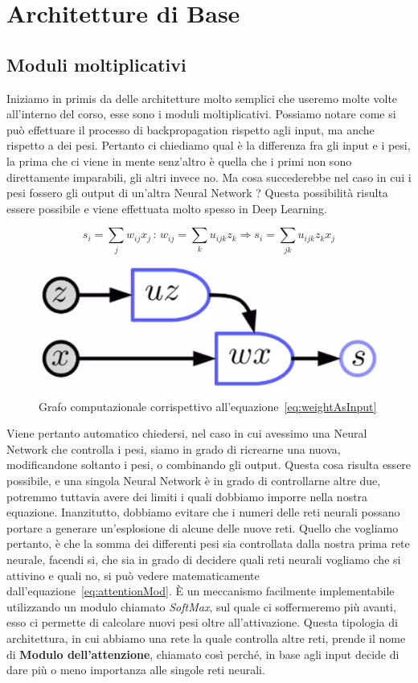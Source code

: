 \chapter{Architetture di Base}
\section{Moduli moltiplicativi}
Iniziamo in primis da delle architetture molto semplici che useremo molte volte all'interno del corso, esse sono i moduli moltiplicativi. Possiamo notare come si può effettuare il processo di backpropagation rispetto agli input, ma anche rispetto a dei pesi. Pertanto ci chiediamo qual è la differenza fra gli input e i pesi, la prima che ci viene in mente senz'altro è quella che i primi non sono direttamente imparabili, gli altri invece no. Ma cosa succederebbe nel caso in cui i pesi fossero gli output di un'altra Neural Network ? Questa possibilità risulta essere possibile e viene effettuata molto spesso in Deep Learning.

\begin{equation}
    s_i = \sum_{j}w_{ij}x_{j}\,:\, w_{ij}=\sum_ku_{ijk}z_k \Rightarrow s_i=\sum_{jk}u_{ijk}z_kx_j
    \label{eq:weightAsInput}
\end{equation}

\begin{figure}
    \centering
    \includegraphics[width=0.3\linewidth]{figure/WeightAsInput.png}
    \caption{Grafo computazionale corrispettivo all'equazione~\ref{eq:weightAsInput}}
    \label{fig:wai}
\end{figure}

Viene pertanto automatico chiedersi, nel caso in cui avessimo una Neural Network che controlla i pesi, siamo in grado di ricrearne una nuova, modificandone soltanto i pesi, o combinando gli output. Questa cosa risulta essere possibile, e una singola Neural Network è in grado di controllarne altre due, potremmo tuttavia avere dei limiti i quali dobbiamo imporre nella nostra equazione. Inanzitutto, dobbiamo evitare che i numeri delle reti neurali possano portare a generare un'esplosione di alcune delle nuove reti. Quello che vogliamo pertanto, è che la somma dei differenti pesi sia controllata dalla nostra prima rete neurale, facendi si, che sia in grado di decidere quali reti neurali vogliamo che si attivino e quali no, si può vedere matematicamente dall'equazione~\ref{eq:attentionMod}. È un meccanismo facilmente implementabile utilizzando un modulo chiamato \textit{SoftMax}, sul quale ci soffermeremo più avanti, esso ci permette di calcolare nuovi pesi oltre all'attivazione. Questa tipologia di architettura, in cui abbiamo una rete la quale controlla altre reti, prende il nome di \textbf{Modulo dell'attenzione}, chiamato così perché, in base agli input decide di dare più o meno importanza alle singole reti neurali.

